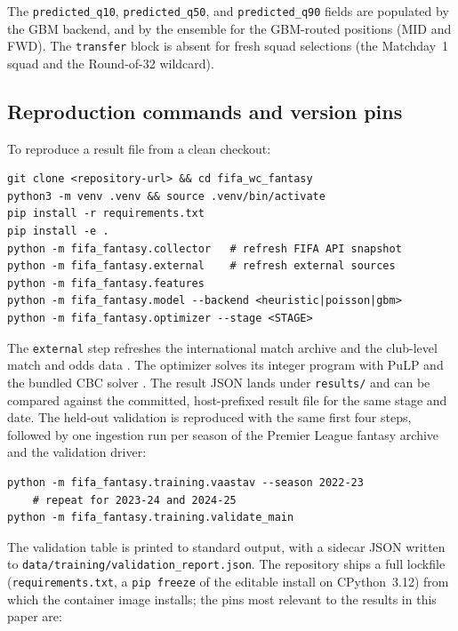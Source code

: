 The \texttt{predicted\_q10}, \texttt{predicted\_q50}, and
\texttt{predicted\_q90} fields are populated by the GBM backend, and
by the ensemble for the GBM-routed positions (MID and FWD). The
\texttt{transfer} block is absent for fresh squad selections (the
Matchday~1 squad and the Round-of-32 wildcard).

\subsection{Reproduction commands and version pins}
\label{sec:appendix-a-repro}

To reproduce a result file from a clean checkout:

\begin{verbatim}
git clone <repository-url> && cd fifa_wc_fantasy
python3 -m venv .venv && source .venv/bin/activate
pip install -r requirements.txt
pip install -e .
python -m fifa_fantasy.collector   # refresh FIFA API snapshot
python -m fifa_fantasy.external    # refresh external sources
python -m fifa_fantasy.features
python -m fifa_fantasy.model --backend <heuristic|poisson|gbm>
python -m fifa_fantasy.optimizer --stage <STAGE>
\end{verbatim}

The \texttt{external} step refreshes the international match archive
\citep{martj42} and the club-level match and odds data
\citep{footballdata}. The optimizer solves its integer program with
PuLP \citep{pulp} and the bundled CBC solver \citep{cbc}. The result
JSON lands under \texttt{results/} and can be compared against the
committed, host-prefixed result file for the same stage and date.
The held-out validation is reproduced with the same first four steps,
followed by one ingestion run per season of the Premier League
fantasy archive \citep{vaastav} and the validation driver:

\begin{verbatim}
python -m fifa_fantasy.training.vaastav --season 2022-23
    # repeat for 2023-24 and 2024-25
python -m fifa_fantasy.training.validate_main
\end{verbatim}

{\sloppy
The validation table is printed to standard output, with a sidecar
JSON written to \texttt{data/training/validation\_report.json}. The
repository ships a full lockfile (\texttt{requirements.txt}, a
\texttt{pip freeze} of the editable install on CPython~3.12) from
which the container image installs; the pins most relevant to the
results in this paper are:\par}

